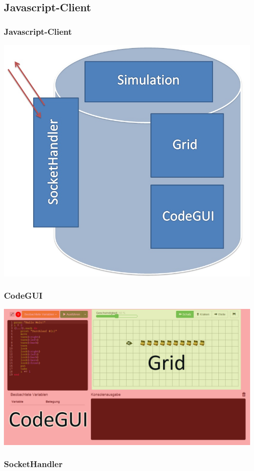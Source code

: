 \subsection{Javascript-Client}

\begin{frame}
\frametitle{Javascript-Client}
\begin{center}
	\includegraphics[scale=0.3]{client/modules.jpg}
\end{center}
\end{frame}

\begin{frame}
\frametitle{CodeGUI}
\begin{center}
	\includegraphics[scale=0.35]{client/client-markiert.png}
\end{center}
\end{frame}

\begin{frame}
\frametitle{SocketHandler}
\inputminted[linenos, numbersep=2pt, tabsize=4, frame=lines, label=Beispiel Paket]{json}{client/packet.json}
\end{frame}